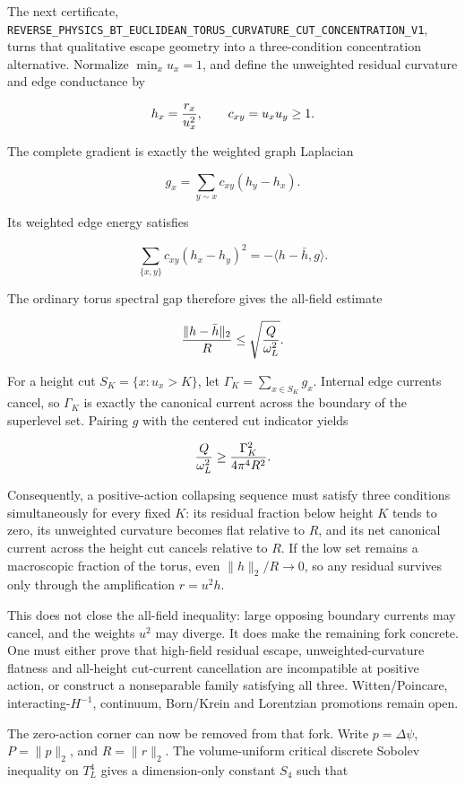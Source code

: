 \documentclass[11pt]{article}
\theoremstyle{definition}
\theoremstyle{remark}
\newcommand{\cert}[1]{\nolinkurl{#1}}
\begin{document}
The next certificate,
\cert{REVERSE_PHYSICS_BT_EUCLIDEAN_TORUS_CURVATURE_CUT_CONCENTRATION_V1},
turns that qualitative escape geometry into a three-condition concentration
alternative.  Normalize \(\min_xu_x=1\), and define the unweighted residual
curvature and edge conductance by

\[
 h_x={r_x\over u_x^2},\qquad c_{xy}=u_xu_y\geq1.
\]

The complete gradient is exactly the weighted graph Laplacian

\[
 g_x=\sum_{y\sim x}c_{xy}(h_y-h_x).
\]

Its weighted edge energy satisfies

\[
 \sum_{\{x,y\}}c_{xy}(h_x-h_y)^2
 =-\langle h-\bar h,g\rangle.
\]

The ordinary torus spectral gap therefore gives the all-field estimate

\[
 {\lVert h-\bar h\rVert_2\over R}
 \leq\sqrt{{Q\over\omega_L^2}}.
\]

For a height cut \(S_K=\{x:u_x>K\}\), let
\(\Gamma_K=\sum_{x\in S_K}g_x\).  Internal edge currents cancel, so
\(\Gamma_K\) is exactly the canonical current across the boundary of the
superlevel set.  Pairing \(g\) with the centered cut indicator yields

\[
 {Q\over\omega_L^2}
 \geq{\Gamma_K^2\over4\pi^4R^2}.
\]

Consequently, a positive-action collapsing sequence must satisfy three
conditions simultaneously for every fixed \(K\): its residual fraction below
height \(K\) tends to zero, its unweighted curvature becomes flat relative to
\(R\), and its net canonical current across the height cut cancels relative to
\(R\).  If the low set remains a macroscopic fraction of the torus, even
\(\lVert h\rVert_2/R\to0\), so any residual survives only through the
amplification \(r=u^2h\).

This does not close the all-field inequality: large opposing boundary currents
may cancel, and the weights \(u^2\) may diverge.  It does make the remaining
fork concrete.  One must either prove that high-field residual escape,
unweighted-curvature flatness and all-height cut-current cancellation are
incompatible at positive action, or construct a nonseparable family satisfying
all three.  Witten/Poincare, interacting-\(H^{-1}\), continuum, Born/Krein and
Lorentzian promotions remain open.

The zero-action corner can now be removed from that fork.  Write
\(p=\Delta\psi\), \(P=\lVert p\rVert_2\), and \(R=\lVert r\rVert_2\).  The
volume-uniform critical discrete Sobolev inequality on \(T_L^4\) gives a
dimension-only constant \(S_4\) such that
\end{document}
